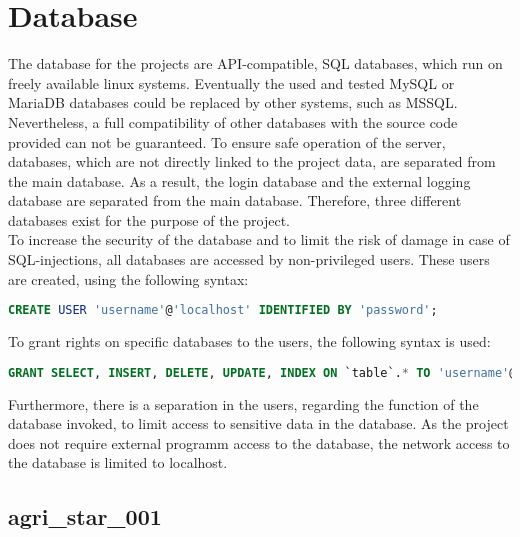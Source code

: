 
\chapter{Database}

The database for the projects are API-compatible, SQL databases, which run on freely available linux systems. Eventually the used and tested MySQL or MariaDB databases could be 
replaced by other systems, such as MSSQL. Nevertheless, a full compatibility of other databases with the source code provided can not be guaranteed. To ensure safe operation of the
server, databases, which are not directly linked to the project data, are separated from the main database. As a result, the login database and the external logging database are 
separated from the main database. Therefore, three different databases exist for the purpose of the project.\\ 
To increase the security of the database and to limit the risk of damage in case of SQL-injections, all databases are accessed by non-privileged users. 
These users are created, using the following syntax: 
\begin{lstlisting}[language=sql]
 CREATE USER 'username'@'localhost' IDENTIFIED BY 'password';
\end{lstlisting}
To grant rights on specific databases to the users, the following syntax is used:
\begin{lstlisting}[language=sql]
 GRANT SELECT, INSERT, DELETE, UPDATE, INDEX ON `table`.* TO 'username'@'localhost';
\end{lstlisting}
Furthermore, there is a 
separation in the users, regarding the function of the database invoked, to limit access to sensitive data in the database. As the project does not require external programm access 
to the database, the network access to the database is limited to localhost.

\section{agri\_star\_001}

